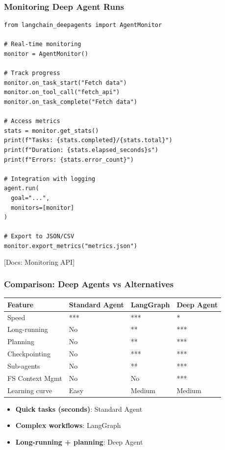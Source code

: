 \documentclass[aspectratio=169,11pt]{beamer}
\newcommand{\docref}[1]{{\scriptsize\color{docgray}[Docs: #1]}}
\begin{document}
\begin{frame}[fragile]
\frametitle{Monitoring Deep Agent Runs}

\begin{lstlisting}
from langchain_deepagents import AgentMonitor

# Real-time monitoring
monitor = AgentMonitor()

# Track progress
monitor.on_task_start("Fetch data")
monitor.on_tool_call("fetch_api")
monitor.on_task_complete("Fetch data")

# Access metrics
stats = monitor.get_stats()
print(f"Tasks: {stats.completed}/{stats.total}")
print(f"Duration: {stats.elapsed_seconds}s")
print(f"Errors: {stats.error_count}")

# Integration with logging
agent.run(
  goal="...",
  monitors=[monitor]
)

# Export to JSON/CSV
monitor.export_metrics("metrics.json")
\end{lstlisting}

\docref{Monitoring API}

\end{frame}

\begin{frame}[fragile]
\frametitle{Comparison: Deep Agents vs Alternatives}

\begin{center}
\small
\begin{tabular}{llll}
\toprule
\textbf{Feature} & \textbf{Standard Agent} & \textbf{LangGraph} & \textbf{Deep Agent} \\
\midrule
Speed & ***  & *** & * \\
Long-running & No & ** & *** \\
Planning & No & ** & *** \\
Checkpointing & No & *** & *** \\
Sub-agents & No & ** & *** \\
FS Context Mgmt & No & No & *** \\
Learning curve & Easy & Medium & Medium \\
\bottomrule
\end{tabular}
\end{center}

\vspace{1em}
\begin{tipbox}
\begin{itemize}
    \setlength{\itemsep}{1pt}
  \item \textbf{Quick tasks (seconds)}: Standard Agent
  \item \textbf{Complex workflows}: LangGraph
  \item \textbf{Long-running + planning}: Deep Agent
\end{itemize}
\end{tipbox}

\end{frame}
\end{document}
